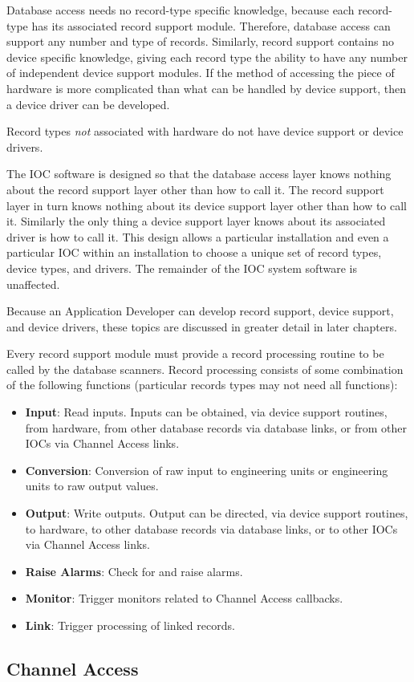 Database access needs no record-type specific knowledge, because each record-type has its associated record support 
module. Therefore, database access can support any number and type of records. Similarly, record support contains no 
device specific knowledge, giving each record type the ability to have any number of independent device support 
modules. If the method of accessing the piece of hardware is more complicated than what can be handled by device 
support, then a device driver can be developed. 

Record types \emph{not} associated with hardware do not have device support or device drivers.

The IOC software is designed so that the database access layer knows nothing about the record support layer other than 
how to call it. The record support layer in turn knows nothing about its device support layer other than how to call it. 
Similarly the only thing a device support layer knows about its associated driver is how to call it. This design allows a 
particular installation and even a particular IOC within an installation to choose a unique set of record types, device types, 
and drivers. The remainder of the IOC system software is unaffected.

Because an Application Developer can develop record support, device support, and device drivers, these topics are 
discussed in greater detail in later chapters.

Every record support module must provide a record processing routine to be called by the database scanners. Record 
processing consists of some combination of the following functions (particular records types may not need all functions):

\begin{itemize}
\item \textbf{\textbf{Input}}:  Read inputs. Inputs can be obtained, via device support routines, from hardware, from other database 
records via database links, or from other IOCs via Channel Access links.

\item \textbf{\textbf{Conversion}}:  Conversion of raw input to engineering units or engineering units to raw output values.

\item \textbf{\textbf{Output}}:  Write outputs. Output can be directed, via device support routines, to hardware, to other database records 
via database links, or to other IOCs via Channel Access links.

\item \textbf{\textbf{Raise Alarms}}:  Check for and raise alarms.

\item \textbf{\textbf{Monitor}}:  Trigger monitors related to Channel Access callbacks.

\item \textbf{\textbf{Link}}:  Trigger processing of linked records.

\end{itemize}\subsection{Channel Access}

